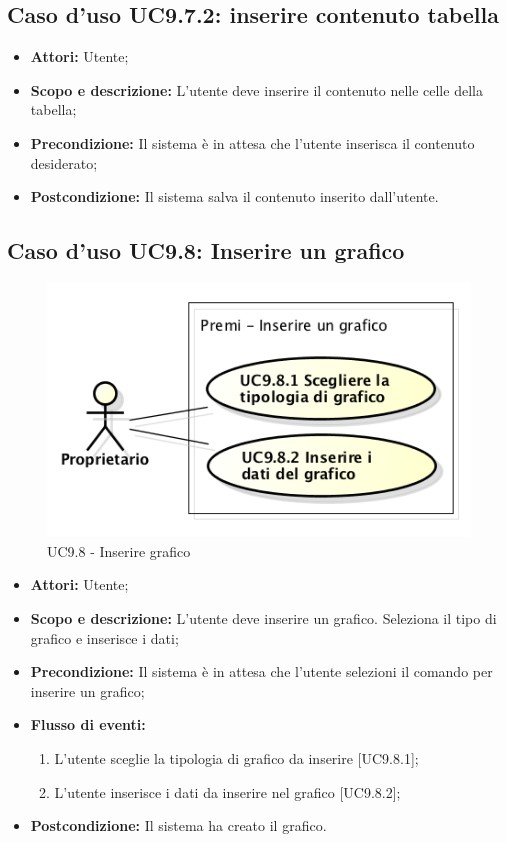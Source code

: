 	\subsection{Caso d'uso UC9.7.2: inserire contenuto tabella}
	\begin{itemize}
		\item \textbf{Attori:} Utente;
		\item \textbf{Scopo e descrizione:} L'utente deve inserire il contenuto nelle celle della tabella;
		\item \textbf{Precondizione:} Il sistema è in attesa che l'utente inserisca il contenuto desiderato;
		\item \textbf{Postcondizione:} Il sistema salva il contenuto inserito dall'utente.
	\end{itemize}


\subsection{Caso d'uso UC9.8: Inserire un grafico}
\begin{figure}[h] 
	\centering 
	\includegraphics[scale=0.45] {img/UC9.8.png} 
	\caption{UC9.8 - Inserire grafico} 
\end{figure}

\begin{itemize}
	\item \textbf{Attori:} Utente;
	\item \textbf{Scopo e descrizione:} L'utente deve inserire un grafico. Seleziona il tipo di grafico e inserisce i dati;
	\item \textbf{Precondizione:} Il sistema è in attesa che l'utente selezioni il comando per inserire un grafico;
	\item \textbf{Flusso di eventi:}
	\begin{enumerate}
		\item L'utente sceglie la tipologia di grafico da inserire [UC9.8.1];
		\item L'utente inserisce i dati da inserire nel grafico [UC9.8.2];
	\end{enumerate}
	\item \textbf{Postcondizione:} Il sistema ha creato il grafico.
\end{itemize}

